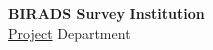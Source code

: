\documentclass[12pt,twoside,a4paper]{article}
\begin{document}
\noindent
\large
\textbf{BIRADS Survey} \hfill \textbf{Institution} \\
\normalsize
\hyperlink{project_link}{Project} \hfill Department \\




\clearpage


\end{document}
